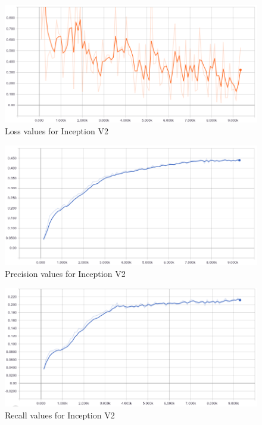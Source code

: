 \documentclass[12pt]{report}
\begin{document}
\vspace{0.5cm}
\begin{figure}[ht!]
	\centering
	\includegraphics[width=15cm]{loss-inception}
	\caption{Loss values for Inception V2}
	\label{fig:loss-inception}
\end{figure}

\vspace{0.5cm}
\begin{figure}[ht!]
	\centering
	\includegraphics[width=15cm]{precision-inception}
	\caption{Precision values for Inception V2}
	\label{fig:precision-inception}
\end{figure}

\vspace{0.5cm}
\begin{figure}[ht!]
	\centering
	\includegraphics[width=15cm]{recall-inception}
	\caption{Recall values for Inception V2}
	\label{fig:recall-inception}
\end{figure}
\end{document}
